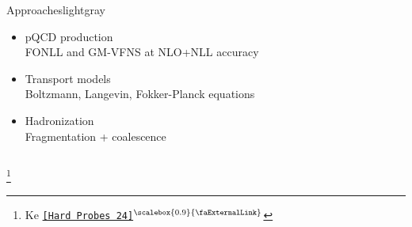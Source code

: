 \documentclass[aspectratio=169,11pt,usenames,dvipsnames]{beamer}
\renewcommand{\thefootnote}{\color{customblue}\faPaperPlaneO}
\newcommand\blfootnote[1]{%
  \begingroup
  \renewcommand\thefootnote{}\footnote{#1}%
  \addtocounter{footnote}{-1}%
  \endgroup
}
\begin{document}
\begin{frame}
{\begin{columns}[onlytextwidth,t]
\begin{center}
\begin{custombox2transp}{\color{normal}Approaches}{lightgray}
\begin{varwidth}{0.85\textwidth}
\begin{itemize}
                    \item {}pQCD production\\[1pt]
                        {\color{lightgray}\scriptsize FONLL and GM-VFNS at NLO+NLL accuracy}
                    \item {}Transport models\\[1pt]
                        {\color{lightgray}\scriptsize Boltzmann, Langevin, Fokker-Planck equations}
                    \item {}Hadronization\\[1pt]
                        {\color{lightgray}\scriptsize Fragmentation + coalescence}  
                \end{itemize}
                \end{varwidth}
            \end{custombox2transp}
            \end{center}
    \end{columns}}
    \begin{center}
        \vspace{-10pt}
    \end{center}
    \vspace{-5pt}    
    \blfootnote{\scriptsize Ke \href{https://indico.cern.ch/event/1339555/contributions/6038190/}{{\color{jyured}\texttt{[Hard Probes 24]$^\text{\scalebox{0.9}{\faExternalLink}}$}}}}

\end{frame}
\end{document}
